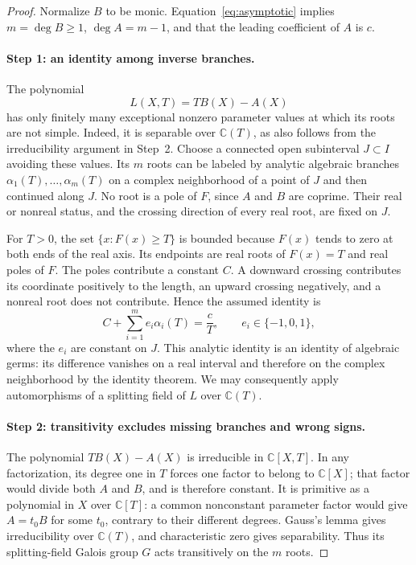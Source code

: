 \documentclass[11pt,a4paper]{article}
\theoremstyle{remark}
\begin{document}
\begin{proof}
Normalize $B$ to be monic. Equation~\eqref{eq:asymptotic} implies
$m=\deg B\ge1$, $\deg A=m-1$, and that the leading coefficient of
$A$ is $c$.

\paragraph{Step 1: an identity among inverse branches.}
The polynomial
\[
 L(X,T)=T B(X)-A(X)
\]
has only finitely many exceptional nonzero parameter values at which
its roots are not simple. Indeed, it is separable over $\mathbb C(T)$,
as also follows from the irreducibility argument in Step~2.
Choose a connected open subinterval $J\subset I$ avoiding these values.
Its $m$ roots can be labeled by analytic algebraic branches
$\alpha_1(T),\ldots,\alpha_m(T)$ on a complex neighborhood of a point
of $J$ and then continued along $J$. No root is a pole of $F$, since
$A$ and $B$ are coprime. Their real or nonreal status, and the crossing
direction of every real root, are fixed on $J$.

For $T>0$, the set $\{x:F(x)\ge T\}$ is bounded because $F(x)$ tends
to zero at both ends of the real axis. Its endpoints are real roots
of $F(x)=T$ and real poles of $F$. The poles contribute a constant
$C$. A downward crossing contributes its coordinate positively to
the length, an upward crossing negatively, and a nonreal root does
not contribute. Hence the assumed identity is
\begin{equation}\label{eq:signed-trace}
 C+\sum_{i=1}^m e_i\alpha_i(T)=\frac cT,\qquad
 e_i\in\{-1,0,1\},
\end{equation}
where the $e_i$ are constant on $J$.
This analytic identity is an identity of algebraic germs: its
difference vanishes on a real interval and therefore on the complex
neighborhood by the identity theorem. We may consequently apply
automorphisms of a splitting field of $L$ over $\mathbb C(T)$.

\paragraph{Step 2: transitivity excludes missing branches and wrong signs.}
The polynomial $T B(X)-A(X)$ is irreducible in $\mathbb C[X,T]$.
In any factorization, its degree one in $T$ forces one factor to
belong to $\mathbb C[X]$; that factor would divide both $A$ and $B$,
and is therefore constant. It is primitive as a polynomial in $X$
over $\mathbb C[T]$: a common nonconstant parameter factor would
give $A=t_0B$ for some $t_0$, contrary to their different degrees.
Gauss's lemma gives irreducibility over $\mathbb C(T)$, and
characteristic zero gives separability. Thus its splitting-field
Galois group $G$ acts transitively on the $m$ roots.


\end{proof}
\end{document}
